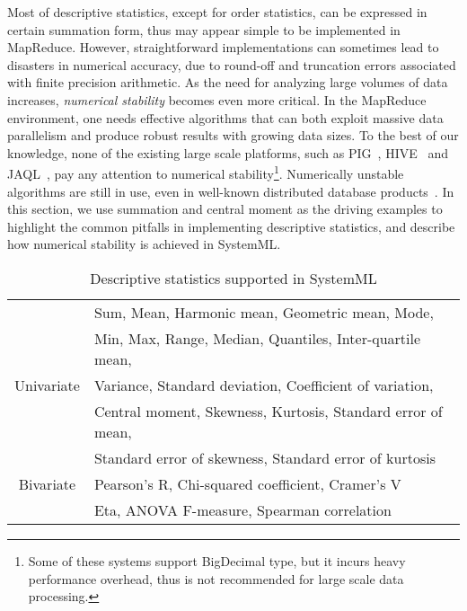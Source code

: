 Most of descriptive statistics, except for order statistics, can be expressed in certain summation form, thus may appear simple to be implemented in MapReduce. However, straightforward implementations can sometimes lead to disasters in numerical accuracy, due to round-off and truncation errors associated with finite precision arithmetic. As the need for analyzing large volumes of data increases, \textit{numerical stability} becomes even more critical.
In the MapReduce environment, one needs effective algorithms that can both exploit massive data parallelism and produce robust results with growing data sizes. To the best of our knowledge, none of the existing large scale platforms, such as PIG~\cite{pig}, HIVE~\cite{hive} and JAQL~\cite{jaql}, pay any attention to numerical stability\footnote{Some of these systems support BigDecimal type, but it incurs heavy performance overhead, thus is not recommended for large scale data processing.}.
Numerically unstable algorithms are still in use, even in well-known distributed database products~\cite{teradata}. In this section, we use summation and central moment as the driving examples to highlight the common pitfalls in implementing descriptive statistics, and describe how numerical stability is achieved in SystemML.

\begin{table}[t]
\centering
\begin{tabular}{|c|l|}
\hline
&Sum, Mean, Harmonic mean, Geometric mean, Mode,\\
 &  Min, Max, Range, Median, Quantiles, Inter-quartile mean, \\ 
Univariate & Variance, Standard deviation, Coefficient of variation, \\
& Central moment, Skewness, Kurtosis, Standard error of mean,\\
& Standard error of skewness, Standard error of kurtosis\\
\hline
Bivariate & Pearson's R, Chi-squared coefficient, Cramer's V\\
&  Eta, ANOVA F-measure, Spearman correlation\\
\hline
\end{tabular}
\Crunch
\caption{Descriptive statistics supported in SystemML}
\BigCrunch
\label{tab:stats}
\BigCrunch
\end{table}

